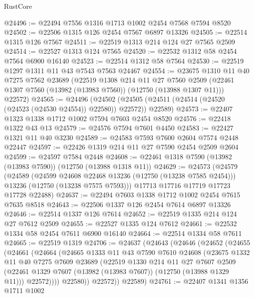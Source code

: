 \begin{lexlean}{RustCore}
\begin{coremodule}
@24496 := @22494 @7556 @1316 @1713 @1002 @2454 @7568 @7594 @8520
@24502 := @22506 @1315 @126 @2454 @7567 @6897 @13326
@24505 := @22514 @1315 @126 @7567
@24511 := @22519 @1313 @214 @124 @27 @7565 @2509
@24514 := @22527 @1313 @124 @7565
@24520 := @22532 @1312 @58 @2454 @7564 @6900 @16140
@24523 := @22514 @1312 @58 @7564
@24530 := @22519 @1297 @1311 @11 @43 @7543 @7563 @24467
@24554 := @23675
    @1310
    @11
    @40
    @7275
    @7562
    @23689
    (@22519
      @1308
      @214
      @11
      @27
      @7560
      @2509
      (@22461 @1307 @7560 (@13982 (@13983 @7560)) (@12750 (@13988 @1307 @11)))
      @22572)
@24565 := @24496
    (@24502 (@24505 (@24511 (@24514 (@24520 (@24523 (@24530 @24554)) @22580)) @22572)) @22589)
@24573 := @22407 @1323 @1338 @1712 @1002 @7594 @7603 @2454 @8520
@24576 := @22418 @1322 @43 @13
@24579 := @24576 @7594 @7601 @4450
@24583 := @22427 @1321 @11 @40 @3230
@24589 := @24583 @7593 @7600 @2604 @7574 @2448 @22447
@24597 := @22426 @1319 @214 @11 @27 @7590 @2454 @2509 @2604
@24599 := @24597 @7584 @2448
@24608 := @22461 @1318 @7590 (@13982 (@13983 @7590)) (@12750 (@13988 @1318 @11))
@24629 := @24573
    (@24579
      (@24589
        (@24599 @24608 @22468 @13236 (@12750 (@13238 @7585 @2454)))
        @13236
        (@12750 (@13238 @7575 @7593)))
      @17713
      @17716
      @17719
      @17723
      @17728
      @22488)
@24637 := @22494 @7603 @1338 @1712 @1002 @2454 @7615 @7635 @8518
@24643 := @22506 @1337 @126 @2454 @7614 @6897 @13326
@24646 := @22514 @1337 @126 @7614
@24652 := @22519 @1335 @214 @124 @27 @7612 @2509
@24655 := @22527 @1335 @124 @7612
@24661 := @22532 @1334 @58 @2454 @7611 @6900 @16140
@24664 := @22514 @1334 @58 @7611
@24665 := @22519 @1319
@24706 := @24637
    (@24643
      (@24646
        (@24652
          (@24655
            (@24661
              (@24664
                (@24665
                  @1333
                  @11
                  @43
                  @7590
                  @7610
                  @24608
                  (@23675
                    @1332
                    @11
                    @40
                    @7275
                    @7609
                    @23689
                    (@22519
                      @1330
                      @214
                      @11
                      @27
                      @7607
                      @2509
                      (@22461 @1329 @7607 (@13982 (@13983 @7607)) (@12750 (@13988 @1329 @11)))
                      @22572))))
              @22580))
          @22572))
      @22589)
@24761 := @22407
    @1341
    @1356
    @1711
    @1002

\end{coremodule}
\end{lexlean}
